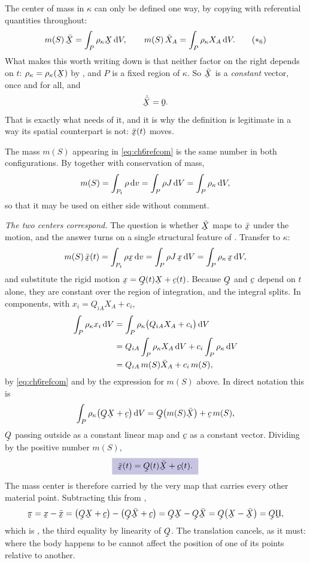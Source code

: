 \begin{solution}
The center of mass in $\kappa$ can only be defined one way, by copying
 with referential quantities throughout:
\begin{equation}
   m(S)\,\bar{\bX}=\int_{P}\rho_{\kappa}\bX\,\dl V ,
   \qquad
   m(S)\,\bar X_{A}=\int_{P}\rho_{\kappa}X_{A}\,\dl V .
   \tag{$\ast_{6}$}\label{eq:ch6refcom}
\end{equation}
What makes this worth writing down is that neither factor on the right
depends on $t$: $\rho_{\kappa}=\rho_{\kappa}(\bX)$ by , and
$P$ is a fixed region of $\kappa$. So $\bar\bX$ is a \emph{constant}
vector, once and for all, and
\[
   \dot{\bar\bX}=\bze .
\]
That is exactly what  needs of it, and it is why the
definition is legitimate in a way its spatial counterpart is not:
$\bar\bx(t)$ moves.

The mass $m(S)$ appearing in \eqref{eq:ch6refcom} is the same number in
both configurations. By  together with conservation of mass,
\[
   m(S)=\int_{P_{t}}\rho\,\mathrm{d} v
   =\int_{P}\rho J\,\mathrm{d} V
   =\int_{P}\rho_{\kappa}\,\mathrm{d} V ,
\]
so that it may be used on either side without comment.

\medskip
\noindent\emph{The two centers correspond.}
The question is whether $\bar\bX$ maps to $\bar\bx$ under the motion,
and the answer turns on a single structural feature of .
Transfer  to $\kappa$:
\[
   m(S)\,\bar{\bx}(t)=\int_{P_{t}}\rho\bx\,\dl v
   =\int_{P}\rho J\,\bx\,\dl V
   =\int_{P}\rho_{\kappa}\,\bx\,\dl V ,
\]
and substitute the rigid motion $\bx=\bQ(t)\bX+\bc(t)$. Because $\bQ$
and $\bc$ depend on $t$ alone, they are constant over the region of
integration, and the integral splits. In components, with
$x_{i}=Q_{iA}X_{A}+c_{i}$,
\[
\begin{aligned}
   \int_{P}\rho_{\kappa}x_{i}\,\mathrm{d} V
   &=\int_{P}\rho_{\kappa}\big(Q_{iA}X_{A}+c_{i}\big)\,\mathrm{d} V\\
   &=Q_{iA}\int_{P}\rho_{\kappa}X_{A}\,\mathrm{d} V
    +c_{i}\int_{P}\rho_{\kappa}\,\mathrm{d} V\\
   &=Q_{iA}\,m(S)\bar X_{A}+c_{i}\,m(S) ,
\end{aligned}
\]
by \eqref{eq:ch6refcom} and by the expression for $m(S)$ above. In
direct notation this is
\[
   \int_{P}\rho_{\kappa}\big(\bQ\bX+\bc\big)\,\dl V
   =\bQ\big(m(S)\bar{\bX}\big)+\bc\,m(S) ,
\]
$\bQ$ passing outside as a constant linear map and $\bc$ as a constant
vector. Dividing by the positive number $m(S)$,
\[
   \boxed{\ \bar{\bx}(t)=\bQ(t)\bar{\bX}+\bc(t).\ }
\]
The mass center is therefore carried by the very map that carries every
other material point. Subtracting this from ,
\[
   \vek\pi=\bx-\bar{\bx}=\big(\bQ\bX+\bc\big)
   -\big(\bQ\bar{\bX}+\bc\big)
   =\bQ\bX-\bQ\bar\bX
   =\bQ\big(\bX-\bar{\bX}\big)=\bQ\vek\Pi ,
\]
which is , the third equality by linearity of $\bQ$. The
translation cancels, as it must: where the body happens to be cannot
affect the position of one of its points relative to another.


\end{solution}
